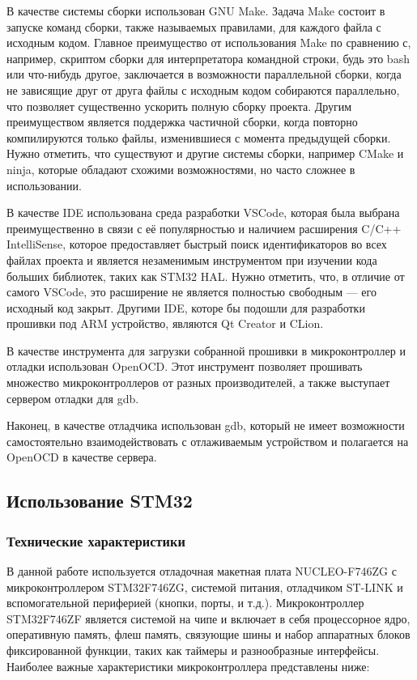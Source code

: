 \documentclass[rusmathsym, eqnumwithinsec, amspack, hyperref]{bomgost}
\begin{document}
В качестве системы сборки использован GNU Make. Задача Make состоит в запуске команд сборки, также называемых правилами, для каждого файла с исходным кодом. Главное преимущество от использования Make по сравнению с, например, скриптом сборки для интерпретатора командной строки, будь это bash или что-нибудь другое, заключается в возможности параллельной сборки, когда не зависящие друг от друга файлы с исходным кодом собираются параллельно, что позволяет существенно ускорить полную сборку проекта. Другим преимуществом является поддержка частичной сборки, когда повторно компилируются только файлы, изменившиеся с момента предыдущей сборки. Нужно отметить, что существуют и другие системы сборки, например CMake и ninja, которые обладают схожими возможностями, но часто сложнее в использовании.

В качестве IDE использована среда разработки VSCode, которая была выбрана преимущественно в связи с её популярностью и наличием расширения C/C++ IntelliSense, которое предоставляет быстрый поиск идентификаторов во всех файлах проекта и является незаменимым инструментом при изучении кода больших библиотек, таких как STM32 HAL. Нужно отметить, что, в отличие от самого VSCode, это расширение не является полностью свободным --- его исходный код закрыт. Другими IDE, которе бы подошли для разработки прошивки под ARM устройство, являются Qt Creator и CLion.

В качестве инструмента для загрузки собранной прошивки в микроконтроллер и отладки использован OpenOCD. Этот инструмент позволяет прошивать множество микроконтроллеров от разных производителей, а также выступает сервером отладки для gdb.

Наконец, в качестве отладчика использован gdb, который не имеет возможности самостоятельно взаимодействовать с отлаживаемым устройством и полагается на OpenOCD в качестве сервера.

\subsection{Использование STM32}

\subsubsection{Технические характеристики}

В данной работе используется отладочная макетная плата NUCLEO-F746ZG с микроконтроллером STM32F746ZG, системой питания, отладчиком ST-LINK и вспомогательной периферией (кнопки, порты, и т.д.). Микроконтроллер STM32F746ZF является системой на чипе и включает в себя процессорное ядро, оперативную память, флеш память, связующие шины и набор аппаратных блоков фиксированной функции, таких как таймеры и разнообразные интерфейсы. Наиболее важные характеристики микроконтроллера представлены ниже:
\end{document}
